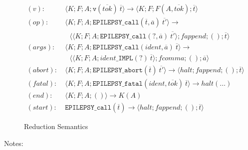 \documentclass[12pt]{article}
\theoremstyle{break}
\begin{document}
\begin{figure}
    \caption{Reduction Semantics}

    \begin{align*}
        (v): & \ \langle K; F; A; \texttt{v}(\overline{tok}) \ \overline{t} \rangle \to
            \langle K; F; F(A, \overline{tok}); \overline{t} \rangle \\
        (op): & \ \langle K; F; A; \texttt{EPILEPSY\_call}(\overline{t}, \overline{a}) \ \overline{t'} \rangle \to \\
            & \ \ \ \ \langle \langle K; F; A; \texttt{EPILEPSY\_call}(?, \overline{a}) \ \overline{t'} \rangle; fappend; (); \overline{t} \rangle \\
        (args): & \ \langle K; F; A; \texttt{EPILEPSY\_call}(ident, \overline{a}) \ \overline{t} \rangle \to \\
            & \ \ \ \ \langle \langle K; F; A; ident\texttt{\_IMPL}(?) \ \overline{t} \rangle; fcomma; (); \overline{a} \rangle \\
        (abort): & \ \langle K; F; A; \texttt{EPILEPSY\_abort}(\overline{t}) \ \overline{t'} \rangle \to \langle halt; fappend; (); \overline{t} \rangle \\
        (fatal): & \ \langle K; F; A; \texttt{EPILEPSY\_fatal}(ident, \overline{tok}) \ \overline{t} \rangle \to halt(\ldots) \\
        (end): & \ \langle K; F; A; () \rangle \to K(A) \\
        (start): & \ \texttt{EPILEPSY\_call}(\overline{t}) \to \langle halt; fappend; (); \overline{t} \rangle
    \end{align*}
    \label{ReductionSemantics}
\end{figure}

Notes:
\end{document}
